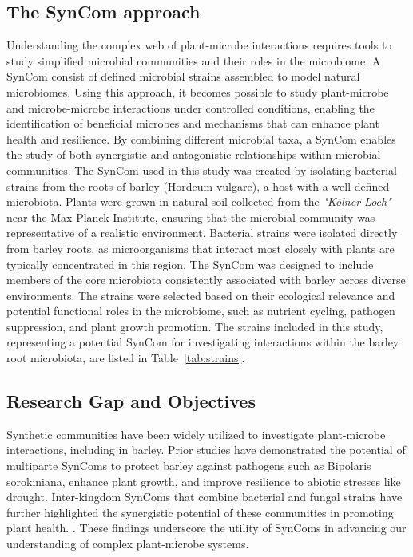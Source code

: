 \subsection{The SynCom approach}
Understanding the complex web of plant-microbe interactions requires tools to study simplified microbial communities and their roles in the microbiome. A \ac{SynCom} consist of defined microbial strains assembled to model natural microbiomes. 
Using this approach, it becomes possible to study plant-microbe and microbe-microbe interactions under controlled conditions, enabling the identification of beneficial microbes and mechanisms that can enhance plant health and resilience. By combining different microbial taxa, a \ac{SynCom} enables the study of both synergistic and antagonistic relationships within microbial communities.
The \ac{SynCom} used in this study was created by isolating bacterial strains from the roots of barley (Hordeum vulgare), a host with a well-defined microbiota. Plants were grown in natural soil collected from the \textit{"Kölner Loch"} \footnotemark {} near the Max Planck Institute, ensuring that the microbial community was representative of a realistic environment. Bacterial strains were isolated directly from barley roots, as microorganisms that interact most closely with plants are typically concentrated in this region.
The \ac{SynCom} was designed to include members of the core microbiota consistently associated with barley across diverse environments. The strains were selected based on their ecological relevance and potential functional roles in the microbiome, such as nutrient cycling, pathogen suppression, and plant growth promotion. The strains included in this study, representing a potential \ac{SynCom} for investigating interactions within the barley root microbiota, are listed in Table~\ref{tab:strains}.

\subsection{Research Gap and Objectives}
Synthetic communities have been widely utilized to investigate plant-microbe interactions, including in barley. Prior studies have demonstrated the potential of multiparte SynComs to protect barley against pathogens such as Bipolaris sorokiniana, enhance plant growth, and improve resilience to abiotic stresses like drought. Inter-kingdom SynComs that combine bacterial and fungal strains have further highlighted the synergistic potential of these communities in promoting plant health. \cite{mahdi2022Fungal}. These findings underscore the utility of SynComs in advancing our understanding of complex plant-microbe systems.

